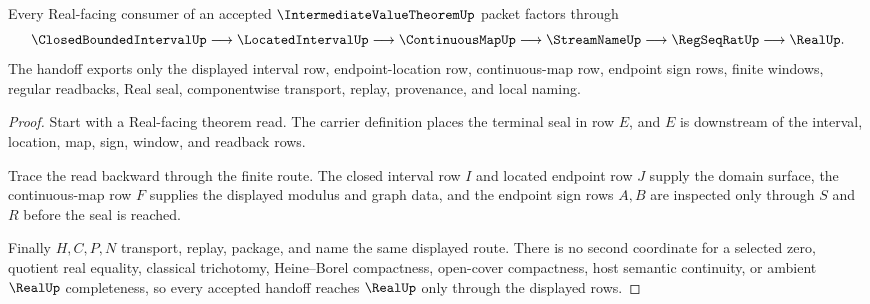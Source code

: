\begin{theorem}
\label{thm:intermediate-value-theorem-finite-sign-route-handoff}
Every Real-facing consumer of an accepted $\IntermediateValueTheoremUp$ packet factors through
$$
\ClosedBoundedIntervalUp \longrightarrow \LocatedIntervalUp \longrightarrow \ContinuousMapUp \longrightarrow \StreamNameUp \longrightarrow \RegSeqRatUp \longrightarrow \RealUp .
$$
The handoff exports only the displayed interval row, endpoint-location row, continuous-map row, endpoint sign rows, finite windows, regular readbacks, Real seal, componentwise transport, replay, provenance, and local naming.
\end{theorem}
\begin{proof}
Start with a Real-facing theorem read. The carrier definition places the terminal seal in row $E$, and $E$ is downstream of the interval, location, map, sign, window, and readback rows.

Trace the read backward through the finite route. The closed interval row $I$ and located endpoint row $J$ supply the domain surface, the continuous-map row $F$ supplies the displayed modulus and graph data, and the endpoint sign rows $A,B$ are inspected only through $S$ and $R$ before the seal is reached.

Finally $H,C,P,N$ transport, replay, package, and name the same displayed route. There is no second coordinate for a selected zero, quotient real equality, classical trichotomy, Heine--Borel compactness, open-cover compactness, host semantic continuity, or ambient $\RealUp$ completeness, so every accepted handoff reaches $\RealUp$ only through the displayed rows.
\end{proof}



